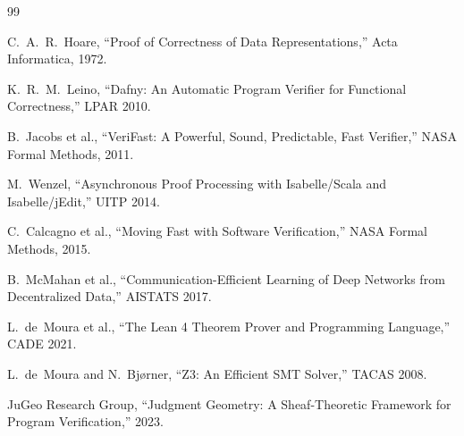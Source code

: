 \documentclass[11pt]{article}
\begin{document}
\begin{thebibliography}{99}

C.~A.~R.~Hoare, ``Proof of Correctness of Data Representations,''
Acta Informatica, 1972.

K.~R.~M.~Leino, ``Dafny: An Automatic Program Verifier for Functional
Correctness,'' LPAR 2010.

B.~Jacobs et al., ``VeriFast: A Powerful, Sound, Predictable, Fast
Verifier,'' NASA Formal Methods, 2011.

M.~Wenzel, ``Asynchronous Proof Processing with Isabelle/Scala and
Isabelle/jEdit,'' UITP 2014.

C.~Calcagno et al., ``Moving Fast with Software Verification,''
NASA Formal Methods, 2015.

B.~McMahan et al., ``Communication-Efficient Learning of Deep Networks
from Decentralized Data,'' AISTATS 2017.

L.~de~Moura et al., ``The Lean 4 Theorem Prover and Programming Language,''
CADE 2021.

L.~de~Moura and N.~Bjørner, ``Z3: An Efficient SMT Solver,'' TACAS 2008.

JuGeo Research Group, ``Judgment Geometry: A Sheaf-Theoretic Framework for
Program Verification,'' 2023.

\end{thebibliography}
\end{document}
